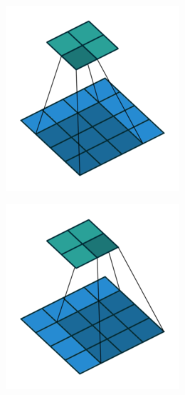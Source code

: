 \begin{figure}[h]
\begin{subfigure}[b]{0.24\textwidth}
  \end{subfigure}
  \begin{subfigure}[b]{0.24\textwidth}
    \includegraphics[width=\textwidth]{figures/no_padding_no_strides_02}
  \end{subfigure}
  \begin{subfigure}[b]{0.24\textwidth}
    \includegraphics[width=\textwidth]{figures/no_padding_no_strides_03}

\end{subfigure}
\end{figure}
